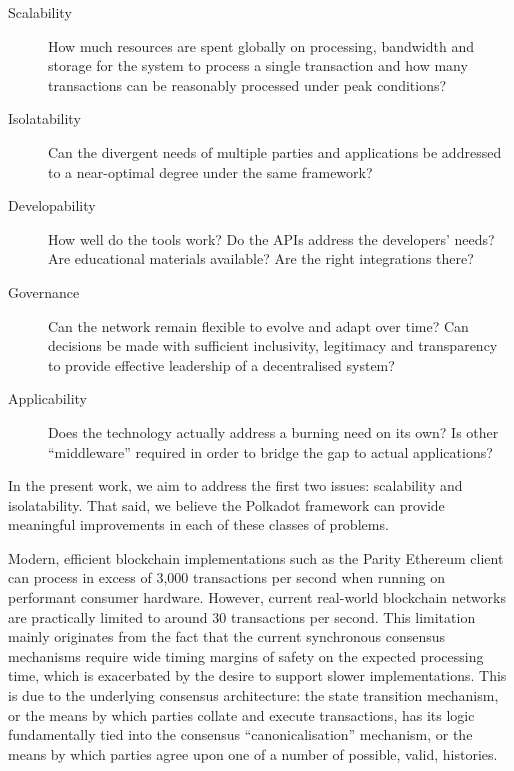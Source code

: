 \documentclass[usepdftitle=false]{beamer}
\begin{document}
\begin{frame}
\begin{description}
\item[Scalability] How much resources are spent globally on processing, bandwidth and storage for the system to process a single transaction and how many transactions can be reasonably processed under peak conditions?
\item[Isolatability] Can the divergent needs of multiple parties and applications be addressed to a near-optimal degree under the same framework?
\item[Developability] How well do the tools work? Do the APIs address the developers' needs? Are educational materials available? Are the right integrations there?
\item[Governance] Can the network remain flexible to evolve and adapt over time? Can decisions be made with sufficient inclusivity, legitimacy and transparency to provide effective leadership of a decentralised system?
\item[Applicability] Does the technology actually address a burning need on its own? Is other ``middleware'' required in order to bridge the gap to actual applications?
\end{description}

 In the present work, we aim to address the first two issues: scalability and isolatability. That said, we believe the Polkadot framework can provide meaningful improvements in each of these classes of problems.

Modern, efficient blockchain implementations such as the Parity Ethereum client\cite{parity} can process in excess of 3,000 transactions per second when running on performant consumer hardware. However, current real-world blockchain networks are practically limited to around 30 transactions per second. This limitation mainly originates from the fact that the current synchronous consensus mechanisms require wide timing margins of safety on the expected processing time, which is exacerbated by the desire to support slower implementations. This is due to the underlying consensus architecture: the state transition mechanism, or the means by which parties collate and execute transactions, has its logic fundamentally tied into the consensus ``canonicalisation'' mechanism, or the means by which parties agree upon one of a number of possible, valid, histories.


\end{frame}
\end{document}
